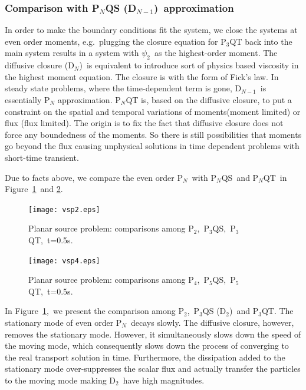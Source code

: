 \documentclass[review]{elsarticle}
\newcommand{\pn}{P$_N$}
\newcommand{\pnqt}{P$_N$QT}
\newcommand{\pnqs}{P$_N$QS}
\newcommand{\psii}[1]{\psi_\ensuremath{{#1}}}
\begin{document}
\subsubsection*{Comparison with P$_N$QS (D$_{N-1}$)~approximation}
In order to make the boundary conditions fit the system, we close the systems at even order moments, e.g.~plugging the closure equation for P$_3$QT back into the main system results in a system with $\psii{2}$~as the highest-order moment. The diffusive closure (D$_N$)~is equivalent to introduce sort of physics based viscosity in the highest moment equation. The closure is with the form of Fick's law. In steady state problems, where the time-dependent term is gone, D$_{N-1}$~is essentially P$_N$ approximation. P$_N$QT is, based on the diffusive closure, to put a constraint on the spatial and temporal variations of moments(moment limited) or flux (flux limited). The origin is to fix the fact that diffusive closure does not force any boundedness of the moments. So there is still possibilities that moments go beyond the flux causing unphysical solutions in time dependent problems with short-time transient.

Due to facts above, we compare the even order \pn~with \pnqs~and \pnqt~in Figure~\ref{epn}~and \ref{epn2}.

\begin{figure}[ht!]
	\begin{center}
		\hspace*{-0cm}\texttt{[image: vsp2.eps]}
		\caption[]{\label{epn}Planar source problem: comparisons among P$_2$,~P$_3$QS,~P$_3$QT,~t=0.5s.}%
	\end{center}
\end{figure}

\begin{figure}[ht!]
	\begin{center}
		\hspace*{-0cm}\texttt{[image: vsp4.eps]}
		\caption[]{\label{epn2}Planar source problem: comparisons among P$_4$,~P$_5$QS,~P$_5$QT,~t=0.5s.}%
	\end{center}
\end{figure}

In Figure~\ref{epn},~we present the comparison among P$_2$,~P$_3$QS (D$_2$)~and P$_3$QT. The stationary mode of even order \pn~decays slowly. The diffusive closure, however, removes the stationary mode. However, it simultaneously slows down the speed of the moving mode, which consequently slows down the process of converging to the real transport solution in time. Furthermore, the dissipation added to the stationary mode over-suppresses the scalar flux and actually transfer the particles to the moving mode making D$_2$~have high magnitudes.
\end{document}
